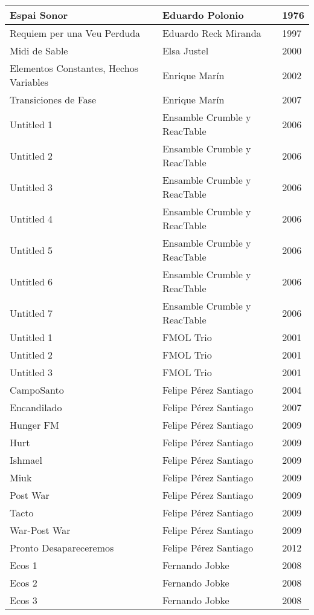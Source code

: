 \begin{center}
\begin{longtable}{| p{} | p{} | p{} |}
Espai Sonor & Eduardo Polonio & 1976 \\ \hline 
Requiem per una Veu Perduda & Eduardo Reck Miranda & 1997 \\ \hline 
Midi de Sable & Elsa Justel & 2000 \\ \hline 
Elementos Constantes, Hechos Variables & Enrique Marín & 2002 \\ \hline 
Transiciones de Fase & Enrique Marín & 2007 \\ \hline 
Untitled 1 & Ensamble Crumble y ReacTable & 2006 \\ \hline 
Untitled 2 & Ensamble Crumble y ReacTable & 2006 \\ \hline 
Untitled 3 & Ensamble Crumble y ReacTable & 2006 \\ \hline 
Untitled 4 & Ensamble Crumble y ReacTable & 2006 \\ \hline 
Untitled 5 & Ensamble Crumble y ReacTable & 2006 \\ \hline 
Untitled 6 & Ensamble Crumble y ReacTable & 2006 \\ \hline 
Untitled 7 & Ensamble Crumble y ReacTable & 2006 \\ \hline 
Untitled 1 & FMOL Trio & 2001 \\ \hline 
Untitled 2 & FMOL Trio & 2001 \\ \hline 
Untitled 3 & FMOL Trio & 2001 \\ \hline 
CampoSanto & Felipe Pérez Santiago & 2004 \\ \hline 
Encandilado & Felipe Pérez Santiago & 2007 \\ \hline 
Hunger FM & Felipe Pérez Santiago & 2009 \\ \hline 
Hurt & Felipe Pérez Santiago & 2009 \\ \hline 
Ishmael & Felipe Pérez Santiago & 2009 \\ \hline 
Miuk & Felipe Pérez Santiago & 2009 \\ \hline 
Post War & Felipe Pérez Santiago & 2009 \\ \hline 
Tacto & Felipe Pérez Santiago & 2009 \\ \hline 
War-Post War & Felipe Pérez Santiago & 2009 \\ \hline 
Pronto Desapareceremos & Felipe Pérez Santiago & 2012 \\ \hline 
Ecos 1 & Fernando Jobke & 2008 \\ \hline 
Ecos 2 & Fernando Jobke & 2008 \\ \hline 
Ecos 3 & Fernando Jobke & 2008 \\ \hline 

\end{longtable}
\end{center}
